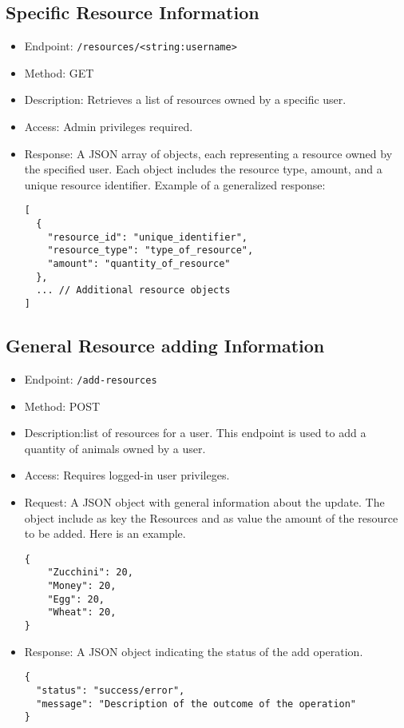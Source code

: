 \documentclass[12pt]{article}
\begin{document}
\subsection{Specific Resource Information}
\begin{itemize}
    \item Endpoint: \texttt{/resources/<string:username>}
    \item Method: GET
    \item Description: Retrieves a list of resources owned by a specific user.
    \item Access: Admin privileges required.
    \item Response: A JSON array of objects, each representing a resource owned by the specified user. Each object includes the resource type, amount, and a unique resource identifier. Example of a generalized response:
    \begin{verbatim}
[
  {
    "resource_id": "unique_identifier",
    "resource_type": "type_of_resource",
    "amount": "quantity_of_resource"
  },
  ... // Additional resource objects
]
    \end{verbatim}
\end{itemize}

\subsection{General Resource adding Information}
\begin{itemize}
    \item Endpoint: \texttt{/add-resources}
    \item Method: POST
    \item Description:list of resources for a user. This endpoint is used to add a quantity of animals owned by a user.
    \item Access: Requires logged-in user privileges.
    \item Request: A JSON object with general information about the update.
    The object include as key the Resources and as value the amount of the resource to be added. Here is an example.
    \begin{verbatim}
{
    "Zucchini": 20,
    "Money": 20,
    "Egg": 20,
    "Wheat": 20,
}
    \end{verbatim}
    \item Response: A JSON object indicating the status of the add operation.
    \begin{verbatim}
{
  "status": "success/error",
  "message": "Description of the outcome of the operation"
}
    \end{verbatim}
\end{itemize}
\end{document}
